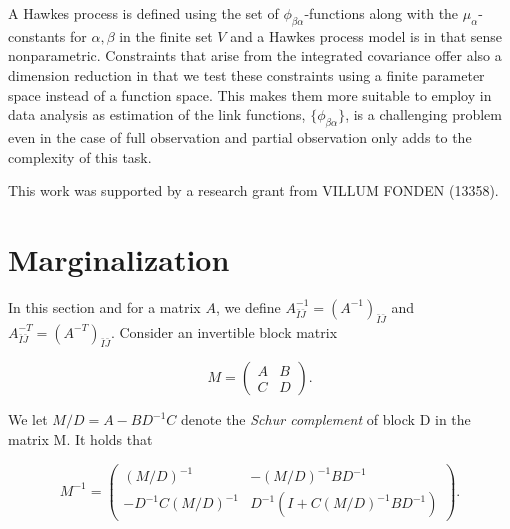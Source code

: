 \documentclass[accepted]{uai2021} %
\begin{document}
A Hawkes process is defined using the set of $\phi_{\beta\alpha}$-functions 
along 
with the $\mu_\alpha$-constants for $\alpha,\beta$ in the finite set $V$ and a 
Hawkes process model is in that sense nonparametric.  Constraints that arise 
from the integrated covariance offer also a dimension reduction in that we  
test these constraints using a finite parameter space instead of a 
function space. This makes them more suitable to employ in data analysis 
as estimation of the link functions, $\{\phi_{\beta\alpha} \}$, is a 
challenging problem even in the case of full 
observation and partial observation only adds to the 
complexity of this task.





\begin{contributions} %

\end{contributions}

\begin{acknowledgements} %
    This work was supported by a research grant from
    VILLUM FONDEN (13358).
\end{acknowledgements}

\appendix

\section{Marginalization}
\label{sec:marg}

In this section and for a matrix $A$, we define $A_{\bar{I}\bar{J}}^{-1} = 
(A^{-1})_{\bar{I}\bar{J}}$ and 
$A_{\bar{I}\bar{J}}^{-T}=(A^{-T})_{\bar{I}\bar{J}}$. Consider an invertible 
block matrix 

$$
M=
\begin{pmatrix}
A & B \\
C & D
\end{pmatrix}.
$$

We let $M / D = A - BD^{-1}C$ denote the \emph{Schur complement} of block D in 
the matrix M. It holds that

$$
M^{-1}=
\begin{pmatrix}
(M/D)^{-1} & -(M/D)^{-1}BD^{-1} \\
-D^{-1}C(M/D)^{-1} & D^{-1}(I + C(M/D)^{-1}BD^{-1})
\end{pmatrix}.
$$
\end{document}
